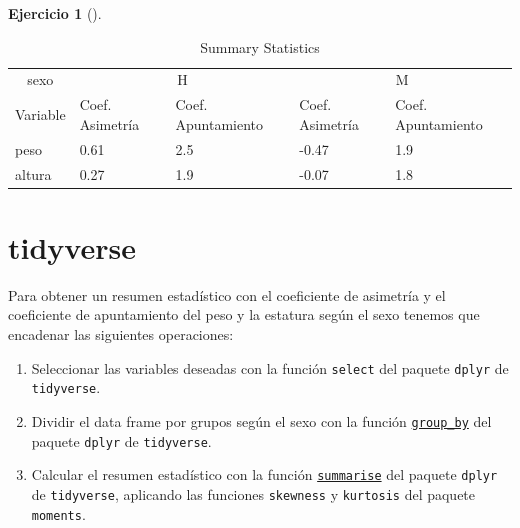 \documentclass[
  spanish,
  a4paper,
]{scrreport}
\providecommand{\tightlist}{%
  \setlength{\itemsep}{0pt}\setlength{\parskip}{0pt}}
\theoremstyle{definition}
\newtheorem{exercise}{Ejercicio}[chapter]
\theoremstyle{remark}
\begin{document}
\begin{exercise}[]
\begin{enumerate}
\begin{tcolorbox}
  \begin{table}

  \caption{\label{tab:unnamed-chunk-52}Summary Statistics}
  \centering
  \begin{tabular}[t]{lllll}
  \toprule
  \multicolumn{1}{c}{sexo} & \multicolumn{2}{c}{H} & \multicolumn{2}{c}{M} \\
  \cmidrule(l{3pt}r{3pt}){1-1} \cmidrule(l{3pt}r{3pt}){2-3} \cmidrule(l{3pt}r{3pt}){4-5}
  Variable & Coef. Asimetría & Coef. Apuntamiento & Coef. Asimetría & Coef. Apuntamiento\\
  \midrule
  peso & 0.61 & 2.5 & -0.47 & 1.9\\
  altura & 0.27 & 1.9 & -0.07 & 1.8\\
  \bottomrule
  \end{tabular}
  \end{table}

  \section{tidyverse}

  Para obtener un resumen estadístico con el coeficiente de asimetría y
  el coeficiente de apuntamiento del peso y la estatura según el sexo
  tenemos que encadenar las siguientes operaciones:

  \begin{enumerate}
  \def\labelenumii{\arabic{enumii}.}
  \tightlist
  \item
    Seleccionar las variables deseadas con la función \texttt{select}
    del paquete \texttt{dplyr} de \texttt{tidyverse}.
  \item
    Dividir el data frame por grupos según el sexo con la función
    \href{https://dplyr.tidyverse.org/reference/group_by.html}{\texttt{group\_by}}
    del paquete \texttt{dplyr} de \texttt{tidyverse}.
  \item
    Calcular el resumen estadístico con la función
    \href{https://dplyr.tidyverse.org/reference/summarise.html}{\texttt{summarise}}
    del paquete \texttt{dplyr} de \texttt{tidyverse}, aplicando las
    funciones \texttt{skewness} y \texttt{kurtosis} del paquete
    \texttt{moments}.
  \end{enumerate}


\end{tcolorbox}
\end{enumerate}
\end{exercise}
\end{document}
